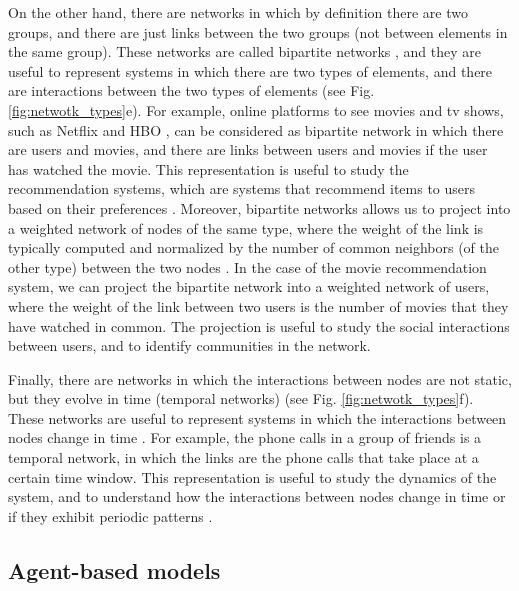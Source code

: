 On the other hand, there are networks in which by definition there are two groups, and there are just links between the two groups (not between elements in the same group). These networks are called bipartite networks \cite{newman2001structure}, and they are useful to represent systems in which there are two types of elements, and there are interactions between the two types of elements \cite{latapy-2008} (see Fig. \ref{fig:netwotk_types}e). For example, online platforms to see movies and tv shows, such as Netflix \cite{netflix} and HBO \cite{HBO}, can be considered as bipartite network in which there are users and movies, and there are links between users and movies if the user has watched the movie. This representation is useful to study the recommendation systems, which are systems that recommend items to users based on their preferences \cite{ricci-2011}. Moreover, bipartite networks allows us to project into a weighted network of nodes of the same type, where the weight of the link is typically computed and normalized by the number of common neighbors (of the other type) between the two nodes \cite{newman-2001-collaboration}. In the case of the movie recommendation system, we can project the bipartite network into a weighted network of users, where the weight of the link between two users is the number of movies that they have watched in common. The projection is useful to study the social interactions between users, and to identify communities in the network.

Finally, there are networks in which the interactions between nodes are not static, but they evolve in time (temporal networks) \cite{Holme2012Temporal} (see Fig. \ref{fig:netwotk_types}f). These networks are useful to represent systems in which the interactions between nodes change in time \cite{Perra2012ActivityDriven}. For example, the phone calls in a group of friends is a temporal network, in which the links are the phone calls that take place at a certain time window. This representation is useful to study the dynamics of the system, and to understand how the interactions between nodes change in time \cite{karsai-2011} or if they exhibit periodic patterns \cite{Jo2012Circadian}.

\subsection{\label{subsec:Agent-based models} Agent-based models}

